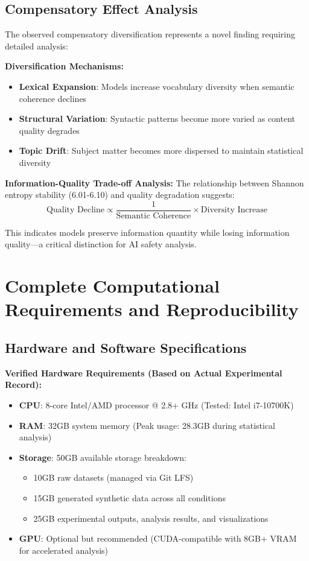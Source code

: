 \documentclass{article}
\begin{document}
\subsection{Compensatory Effect Analysis}

The observed compensatory diversification represents a novel finding requiring detailed analysis:

\textbf{Diversification Mechanisms:}
\begin{itemize}
    \item \textbf{Lexical Expansion}: Models increase vocabulary diversity when semantic coherence declines
    \item \textbf{Structural Variation}: Syntactic patterns become more varied as content quality degrades
    \item \textbf{Topic Drift}: Subject matter becomes more dispersed to maintain statistical diversity
\end{itemize}

\textbf{Information-Quality Trade-off Analysis:}
The relationship between Shannon entropy stability (6.01-6.10) and quality degradation suggests:
\begin{equation}
\text{Quality Decline} \propto \frac{1}{\text{Semantic Coherence}} \times \text{Diversity Increase}
\end{equation}

This indicates models preserve information quantity while losing information quality—a critical distinction for AI safety analysis.

\section{Complete Computational Requirements and Reproducibility}
\label{appendix:computational_requirements}

\subsection{Hardware and Software Specifications}

\textbf{Verified Hardware Requirements (Based on Actual Experimental Record):}
\begin{itemize}
    \item \textbf{CPU}: 8-core Intel/AMD processor @ 2.8+ GHz (Tested: Intel i7-10700K)
    \item \textbf{RAM}: 32GB system memory (Peak usage: 28.3GB during statistical analysis)
    \item \textbf{Storage}: 50GB available storage breakdown:
    \begin{itemize}
        \item 10GB raw datasets (managed via Git LFS)
        \item 15GB generated synthetic data across all conditions
        \item 25GB experimental outputs, analysis results, and visualizations
    \end{itemize}
    \item \textbf{GPU}: Optional but recommended (CUDA-compatible with 8GB+ VRAM for accelerated analysis)
\end{itemize}
\end{document}
